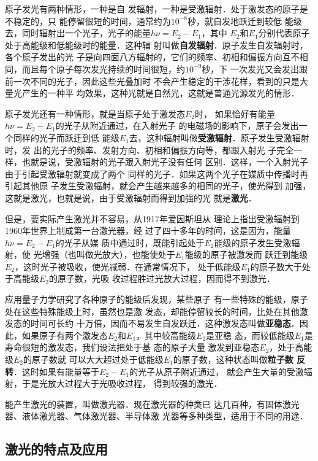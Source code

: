 原子发光有两种情形，一种是自
发辐射，一种是受激辐射．处于激发态的原子是不稳定的，只
能停留很短的时间，通常约为$10^{-8}$秒，就自发地跃迁到较低
能级去，同时辐射出一个光子，光子的能量$h\nu =E_2-E_1$，其中
$E_2$和$E_1$分别代表原子处于高能级和低能级时的能量．这种辐
射叫做\textbf{自发辐射}．原子发生自发辐射时，各个原子发出的光
子是向四面八方辐射的，它们的频率、初相和偏振方向互不相
同，而且每个原子每次发光持续的时间很短，约$10^{-9}$秒，下
一次发光又会发出跟前一次不同的光子，因此这些光叠加时
不会产生稳定的干涉花样，看到的只是大量光产生的一种平
均效果，这种光就是自然光，这就是普通光源发光的情形．

原子发光还有一种情形，就是当原子处于激发态$E_2$时，
如果恰好有能量$h\nu =E_2-E_1$的光子从附近通过，在入射光子
的电磁场的影响下，原子会发出一个同样的光子而跃迁到低
能级$E_1$去，这种辐射叫做\textbf{受激辐射}．原子发生受激辐射时，发
出的光子的频率、发射方向、初相和偏振方向等，都跟入射光
子完全一样，也就是说，受激辐射的光子跟入射光子没有任何
区别．这样，一个入射光子由于引起受激辐射就变成了两个
同样的光子．如果这两个光子在媒质中传播时再引起其他原
子发生受激辐射，就会产生越来越多的相同的光子，使光得到
加强，这就是激光，也就是说，由于受激辐射而得到加强的光
就是\textbf{激光}．

但是，要实际产生激光并不容易，从1917年爱因斯坦从
理论上指出受激辐射到1960年世界上制成第一台激光器，经
过了四十多年的时间，这是因为，能量$h\nu =E_2-E_1$的光子从媒
质中通过时，既能引起处于$E_2$能级的原子发生受激辐射，使
光增强（也叫做光放大），也能使处于$E_1$能级的原子被激发而
跃迁到能级$E_2$，这时光子被吸收，使光减弱．在通常情况下，
处于低能级$E_1$的原子数大于处于高能级$E_2$的原子数，光吸
收过程胜过光放大过程，因而得不到激光．

应用量子力学研究了各种原子的能级后发现，某些原子
有一些特殊的能级，原子处在这些特殊能级上时，虽然也是激
发态，却能停留较长的时间，比处在其他激发态的时间可长约
十万倍，因而不易发生自发跃迁．这种激发态叫做\textbf{亚稳态}．因
此，如果原子有两个激发态$E_2$和$E_1$，其中较高能级$E_2$是亚稳
态，而较低能级$E_1$是寿命很短的激发态，我们设法把处于基
态的原子大量 激发到亚稳态$E_2$，处于高能级$E_2$的原子数就
可以大大超过处于低能级$E_1$的原子数，这种状态叫做\textbf{粒子数
反转}．这时如果有能量等于$E_2-E_1$的光子从原子附近通过，
就会产生大量的受激辐射，于是光放大过程大于光吸收过程，
得到较强的激光．

能产生激光的装置，叫做激光器．现在激光器的种类已
达几百种，有固体激光器、液体激光器、气体激光器、半导体激
光器等多种类型，适用于不同的用途．

\subsection{激光的特点及应用}

